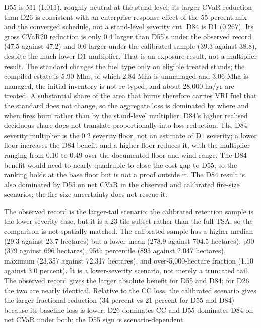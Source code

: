 D55 is M1 (1.011), roughly neutral at the stand level; its larger CVaR reduction than D26 is
consistent with an enterprise-response effect of the 55 percent mix and the converged schedule,
not a stand-level severity cut. D84 is D1 (0.267). Its gross CVaR20 reduction is only \SI{0.4}{\millionCAD} larger than D55's
under the observed record (47.5 against 47.2) and \SI{0.6}{\millionCAD} larger under the calibrated
sample (39.3 against 38.8), despite the much lower D1 multiplier. That is an exposure result, not a
multiplier result. The standard changes the fuel type only on eligible treated stands; the compiled
estate is 5.90 Mha, of which 2.84 Mha is unmanaged and 3.06 Mha is managed, the initial inventory is
not re-typed, and about 28,000 ha/yr are treated. A substantial share of the area that burns therefore
carries VRI fuel that the standard does not change, so the aggregate loss is dominated by where and when fires
burn rather than by the stand-level multiplier. D84's higher realised deciduous share does not
translate proportionally into loss reduction. The D84 severity multiplier is the 0.2 severity floor,
not an estimate of D1 severity; a lower floor increases the D84 benefit and a higher floor reduces
it, with the multiplier ranging from 0.10 to 0.49 over the documented floor and wind range. The D84 benefit would need to nearly quadruple to close the cost gap to D55, so the
ranking holds at the base floor but is not a proof outside it. The D84 result is also dominated by
D55 on net CVaR in the observed and calibrated fire-size scenarios; the fire-size uncertainty does not rescue
it.

The observed record is the larger-tail scenario; the calibrated retention sample is the
lower-severity case, but it is a 23-tile subset rather than the full TSA, so the comparison is not
spatially matched. The calibrated sample has a higher median (29.3 against 23.7 hectares) but a lower
mean (278.9 against 704.5 hectares), p90 (379 against 696 hectares), 95th percentile (893 against
2,047 hectares), maximum (23,357 against 72,317 hectares), and over-5,000-hectare fraction (1.10
against 3.0 percent). It is a lower-severity scenario, not merely a truncated tail. The observed
record gives the larger absolute benefit for D55 and D84; for D26 the two are nearly identical.
Relative to the CC loss, the calibrated scenario gives the larger fractional reduction (34 percent
vs 21 percent for D55 and D84) because its baseline loss is lower. D26 dominates CC and D55 dominates
D84 on net CVaR under both; the D55 sign is scenario-dependent.

